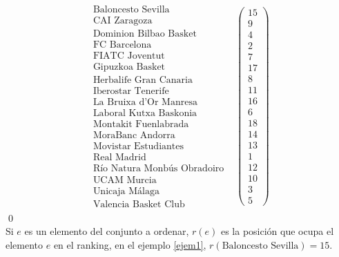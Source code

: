 \[
\begin{array}{ccc}
\begin{array}{c}
\text{Baloncesto Sevilla}\\
\text{CAI Zaragoza} \\
\text{Dominion Bilbao Basket} \\
\text{FC Barcelona} \\
\text{FIATC Joventut} \\
\text{Gipuzkoa Basket} \\
\text{Herbalife Gran Canaria} \\
\text{Iberostar Tenerife} \\
\text{La Bruixa d'Or Manresa} \\
\text{Laboral Kutxa Baskonia} \\
\text{Montakit Fuenlabrada} \\
\text{MoraBanc Andorra} \\
\text{Movistar Estudiantes} \\
\text{Real Madrid} \\
\text{Río Natura Monbús Obradoiro} \\
\text{UCAM Murcia} \\
\text{Unicaja Málaga} \\
\text{Valencia Basket Club}

\end{array} & \left(\begin{array}{c}
15\\
9\\
4\\
2\\
7\\
17\\
8\\
11\\
16\\
6\\
18\\
14\\
13\\
1\\
12\\
10\\
3\\
5
\end{array} \right)
\end{array}  
\]
\qed
\ \\

Si $e$ es un elemento del conjunto a ordenar, $r(e)$ es la posición que ocupa el elemento $e$ en el ranking, en el ejemplo \ref{ejem1}, $r(\text{Baloncesto Sevilla}) = 15$.

